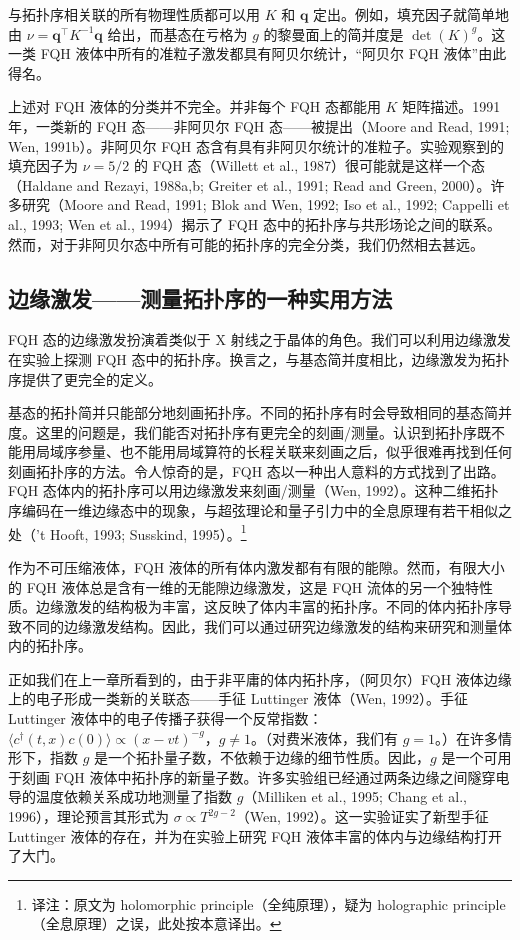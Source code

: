 与拓扑序相关联的所有物理性质都可以用 $K$ 和 $\pmb{q}$ 定出。例如，填充因子就简单地由 $\nu=\pmb{q}^{\top}K^{-1}\pmb{q}$ 给出，而基态在亏格为 $g$ 的黎曼面上的简并度是 $\det(K)^{g}$。这一类 FQH 液体中所有的准粒子激发都具有阿贝尔统计，“阿贝尔 FQH 液体”由此得名。

上述对 FQH 液体的分类并不完全。并非每个 FQH 态都能用 $K$ 矩阵描述。1991 年，一类新的 FQH 态——非阿贝尔 FQH 态——被提出（Moore and Read, 1991; Wen, 1991b）。非阿贝尔 FQH 态含有具有非阿贝尔统计的准粒子。实验观察到的填充因子为 $\nu=5/2$ 的 FQH 态（Willett et al., 1987）很可能就是这样一个态（Haldane and Rezayi, 1988a,b; Greiter et al., 1991; Read and Green, 2000）。许多研究（Moore and Read, 1991; Blok and Wen, 1992; Iso et al., 1992; Cappelli et al., 1993; Wen et al., 1994）揭示了 FQH 态中的拓扑序与共形场论之间的联系。然而，对于非阿贝尔态中所有可能的拓扑序的完全分类，我们仍然相去甚远。

\subsection{边缘激发——测量拓扑序的一种实用方法}

\begin{keypoints}
\item FQH 态的边缘激发扮演着类似于 X 射线之于晶体的角色。我们可以利用边缘激发在实验上探测 FQH 态中的拓扑序。换言之，与基态简并度相比，边缘激发为拓扑序提供了更完全的定义。
\end{keypoints}

基态的拓扑简并只能部分地刻画拓扑序。不同的拓扑序有时会导致相同的基态简并度。这里的问题是，我们能否对拓扑序有更完全的刻画/测量。认识到拓扑序既不能用局域序参量、也不能用局域算符的长程关联来刻画之后，似乎很难再找到任何刻画拓扑序的方法。令人惊奇的是，FQH 态以一种出人意料的方式找到了出路。FQH 态体内的拓扑序可以用边缘激发来刻画/测量（Wen, 1992）。这种二维拓扑序编码在一维边缘态中的现象，与超弦理论和量子引力中的全息原理有若干相似之处（'t Hooft, 1993; Susskind, 1995）。\footnote{译注：原文为 holomorphic principle（全纯原理），疑为 holographic principle（全息原理）之误，此处按本意译出。}

作为不可压缩液体，FQH 液体的所有体内激发都有有限的能隙。然而，有限大小的 FQH 液体总是含有一维的无能隙边缘激发，这是 FQH 流体的另一个独特性质。边缘激发的结构极为丰富，这反映了体内丰富的拓扑序。不同的体内拓扑序导致不同的边缘激发结构。因此，我们可以通过研究边缘激发的结构来研究和测量体内的拓扑序。

正如我们在上一章所看到的，由于非平庸的体内拓扑序，（阿贝尔）FQH 液体边缘上的电子形成一类新的关联态——手征 Luttinger 液体（Wen, 1992）。手征 Luttinger 液体中的电子传播子获得一个反常指数：$\langle c^{\dagger}(t,x)c(0)\rangle\propto(x-vt)^{-g}$，$g\neq1$。（对费米液体，我们有 $g=1$。）在许多情形下，指数 $g$ 是一个拓扑量子数，不依赖于边缘的细节性质。因此，$g$ 是一个可用于刻画 FQH 液体中拓扑序的新量子数。许多实验组已经通过两条边缘之间隧穿电导的温度依赖关系成功地测量了指数 $g$（Milliken et al., 1995; Chang et al., 1996），理论预言其形式为 $\sigma\propto T^{2g-2}$（Wen, 1992）。这一实验证实了新型手征 Luttinger 液体的存在，并为在实验上研究 FQH 液体丰富的体内与边缘结构打开了大门。

